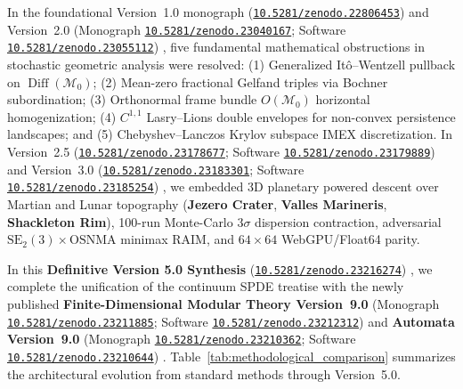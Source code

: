 \documentclass[11pt,a4paper,reqno]{article}
\newcommand{\zenodo}[1]{\href{https://doi.org/10.5281/zenodo.#1}{\nolinkurl{10.5281/zenodo.#1}}}
\theoremstyle{plain}
\theoremstyle{definition}
\theoremstyle{remark}
\numberwithin{equation}{section}
\begin{document}
In the foundational Version~1.0 monograph (\zenodo{22806453}) \cite{ghulame2026spde_v1} and Version~2.0 (Monograph \zenodo{23040167}; Software \zenodo{23055112}) \cite{ananda2026stochastic_fluid_v2, ananda2026stochastic_fluid_v2_software}, five fundamental mathematical obstructions in stochastic geometric analysis were resolved: (1) Generalized It\^o--Wentzell pullback on $\operatorname{Diff}(\mathcal{M}_0)$; (2) Mean-zero fractional Gelfand triples via Bochner subordination; (3) Orthonormal frame bundle $O(\mathcal{M}_0)$ horizontal homogenization; (4) $C^{1,1}$ Lasry--Lions double envelopes for non-convex persistence landscapes; and (5) Chebyshev--Lanczos Krylov subspace IMEX discretization. In Version~2.5 (\zenodo{23178677}; Software \zenodo{23179889}) \cite{ananda2026spde_v25} and Version~3.0 (\zenodo{23183301}; Software \zenodo{23185254}) \cite{ananda2026spde_v30}, we embedded 3D planetary powered descent over Martian and Lunar topography (\textbf{Jezero Crater}, \textbf{Valles Marineris}, \textbf{Shackleton Rim}), 100-run Monte-Carlo $3\sigma$ dispersion contraction, adversarial $\mathrm{SE}_2(3)\times\mathrm{OSNMA}$ minimax RAIM, and $64\times 64$ WebGPU/Float64 parity.

In this \textbf{Definitive Version 5.0 Synthesis} (\zenodo{23216274}) \cite{ananda2026spde_v40}, we complete the unification of the continuum SPDE treatise with the newly published \textbf{Finite-Dimensional Modular Theory Version~9.0} (Monograph \zenodo{23211885}; Software \zenodo{23212312}) \cite{ananda2026finite_v90} and \textbf{Automata Version~9.0} (Monograph \zenodo{23210362}; Software \zenodo{23210644}) \cite{ananda2026automata_v90}. Table~\ref{tab:methodological_comparison} summarizes the architectural evolution from standard methods through Version~5.0.
\end{document}
